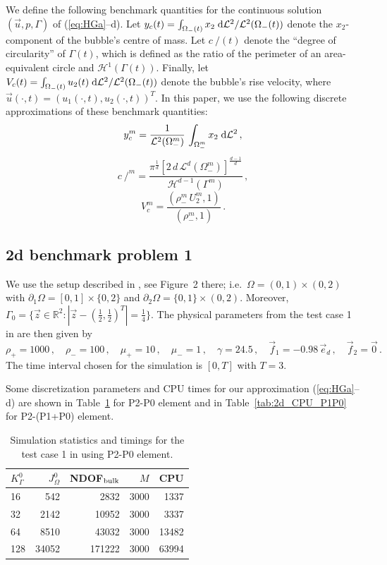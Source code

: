 \documentclass[a4paper,12pt,onecolumn]{article}
\newcommand{\R}{{\mathbb R}}
\newcommand{\dL}[1]{\;{\rm d}{\cal L}^{#1}} %
\newcommand{\strikec}{\mbox{$c\!\!\!\!\:/$}}
\newcommand{\ek}{e}
\begin{document}
We define the following benchmark quantities for the continuous solution $(\vec
u, p, \Gamma)$ of (\ref{eq:HGa}--d).
Let $y_c(t) = \int_{\Omega_-(t)} x_2 \dL2 / \mathcal{L}^2(\Omega_-(t))$ denote
the $x_2$-component of the bubble's centre of mass. Let $\strikec(t)$ denote
the ``degree of circularity'' of $\Gamma(t)$, which is defined as the ratio of
the perimeter of an area-equivalent circle and $\mathcal{H}^{1}(\Gamma(t))$.
Finally, let
$V_c(t) = \int_{\Omega_-(t)} u_2(t) \dL2 / \mathcal{L}^2(\Omega_-(t))$
denote the bubble's rise velocity, where
$\vec u(\cdot,t) = (u_1(\cdot,t),u_2(\cdot,t))^T$.
In this paper, we use the following discrete approximations of
these benchmark quantities:
\begin{equation}
y_c^m = \frac1{\mathcal{L}^2(\Omega_-^m)}\,\int_{\Omega_-^m} x_2 \dL2\,,
\end{equation}
\begin{equation}
\strikec^m =
\frac{\pi^{\frac{1}{d}}[2\,d\,\mathcal{L}^d(\Omega_-^m)]^\frac{d-1}{d}}
{\mathcal{H}^{d-1}(\Gamma^m)}\,,
\end{equation}
\begin{equation}
V^m_c = \frac{(\rho^m_-\,U^m_2, 1)}{(\rho^m_-,1)}\,.
\end{equation}

\subsection{2d benchmark problem 1} \label{sec:2d_benchmark_1}
We use the setup described in \cite{HysingTKPBGT09}, see Figure~2 there;
i.e.\ $\Omega = (0,1) \times (0,2)$ with
$\partial_1\Omega = [0,1] \times \{0,2\}$ and
$\partial_2\Omega = \{0,1\} \times (0,2)$.
Moreover, $\Gamma_0 = \{\vec z \in \R^2 : |\vec z - (\frac12, \frac{1}{2})^T| =
\frac{1}{4}\}$.
The physical parameters from the test case 1 in \cite[Table~I]{HysingTKPBGT09}
are then given by
\begin{equation} \label{eq:Hysing1}
\rho_+ = 1000\,,\quad \rho_- = 100\,,\quad \mu_+ = 10\,,\quad \mu_- = 1\,,\quad
\gamma = 24.5\,,\quad \vec f_1 = -0.98\,\vec\ek_d\,,\quad \vec f_2 = \vec 0\,.
\end{equation}
The time interval chosen for the simulation is $[0,T]$ with $T=3$.

Some discretization parameters and CPU times for our approximation
(\ref{eq:HGa}--d) are shown in Table~\ref{tab:2d_CPU_P0} for P2-P0 element and
in Table~\ref{tab:2d_CPU_P1P0} for P2-(P1+P0) element.
\begin{table}
\center
\begin{tabular}{lrrrr}
\hline
$K^0_\Gamma$ & $J^0_\Omega$ & NDOF$_{\rm bulk}$ & $M$ & CPU \\
\hline
16 & 542 & 2832 & 3000 & 1337 \\
32 & 2142 & 10952 & 3000 & 3337 \\
64 & 8510 & 43032 & 3000 & 13482 \\
128 & 34052 & 171222 & 3000 & 63994 \\
\hline
\end{tabular}
\caption{Simulation statistics and timings for the test case 1 in
\cite{HysingTKPBGT09} using P2-P0 element.}
\label{tab:2d_CPU_P0}
\end{table}
\end{document}

